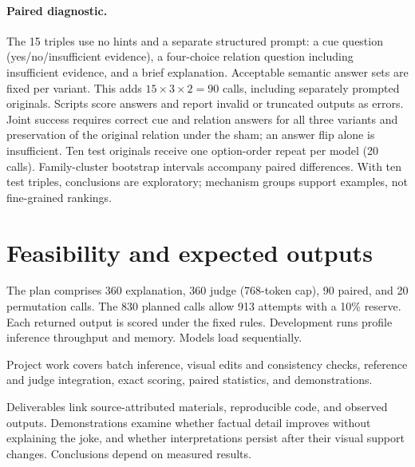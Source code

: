 \documentclass[11pt]{article}
\begin{document}
\paragraph{Paired diagnostic.}
The 15 triples use no hints and a separate structured prompt: a cue question (yes/no/insufficient evidence), a four-choice relation question including insufficient evidence, and a brief explanation. Acceptable semantic answer sets are fixed per variant. This adds $15\times3\times2=90$ calls, including separately prompted originals. Scripts score answers and report invalid or truncated outputs as errors. Joint success requires correct cue and relation answers for all three variants and preservation of the original relation under the sham; an answer flip alone is insufficient. Ten test originals receive one option-order repeat per model (20 calls). Family-cluster bootstrap intervals accompany paired differences. With ten test triples, conclusions are exploratory; mechanism groups support examples, not fine-grained rankings.

\section{Feasibility and expected outputs}
The plan comprises 360 explanation, 360 judge (768-token cap), 90 paired, and 20 permutation calls. The 830 planned calls allow 913 attempts with a 10\% reserve. Each returned output is scored under the fixed rules. Development runs profile inference throughput and memory. Models load sequentially.

Project work covers batch inference, visual edits and consistency checks, reference and judge integration, exact scoring, paired statistics, and demonstrations.

Deliverables link source-attributed materials, reproducible code, and observed outputs. Demonstrations examine whether factual detail improves without explaining the joke, and whether interpretations persist after their visual support changes. Conclusions depend on measured results.
\clearpage

\end{document}
